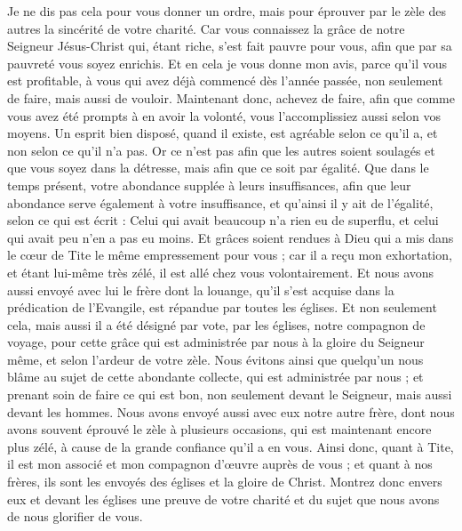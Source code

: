 \begin{multicols}{2}
Je ne dis pas cela pour vous donner un ordre, mais pour éprouver par le zèle des autres la sincérité de votre charité.
Car vous connaissez la grâce de notre Seigneur Jésus-Christ qui, étant riche, s'est fait pauvre pour vous, afin que par sa pauvreté vous soyez enrichis.
Et en cela je vous donne mon avis, parce qu'il vous est profitable, à vous qui avez déjà commencé dès l'année passée, non seulement de faire, mais aussi de vouloir.
Maintenant donc, achevez de faire, afin que comme vous avez été prompts à en avoir la volonté, vous l'accomplissiez aussi selon vos moyens.
Un esprit bien disposé, quand il existe, est agréable selon ce qu'il a, et non selon ce qu'il n'a pas.
Or ce n'est pas afin que les autres soient soulagés et que vous soyez dans la détresse, mais afin que ce soit par égalité. Que dans le temps présent, votre abondance supplée à leurs insuffisances,
afin que leur abondance serve également à votre insuffisance, et qu'ainsi il y ait de l'égalité,
selon ce qui est écrit : Celui qui avait beaucoup n'a rien eu de superflu, et celui qui avait peu n'en a pas eu moins.
Et grâces soient rendues à Dieu qui a mis dans le cœur de Tite le même empressement pour vous ;
car il a reçu mon exhortation, et étant lui-même très zélé, il est allé chez vous volontairement.
Et nous avons aussi envoyé avec lui le frère dont la louange, qu'il s'est acquise dans la prédication de l'Evangile, est répandue par toutes les églises.
Et non seulement cela, mais aussi il a été désigné par vote, par les églises, notre compagnon de voyage, pour cette grâce qui est administrée par nous à la gloire du Seigneur même, et selon l'ardeur de votre zèle.
Nous évitons ainsi que quelqu'un nous blâme au sujet de cette abondante collecte, qui est administrée par nous ;
et prenant soin de faire ce qui est bon, non seulement devant le Seigneur, mais aussi devant les hommes.
Nous avons envoyé aussi avec eux notre autre frère, dont nous avons souvent éprouvé le zèle à plusieurs occasions, qui est maintenant encore plus zélé, à cause de la grande confiance qu'il a en vous.
Ainsi donc, quant à Tite, il est mon associé et mon compagnon d'œuvre auprès de vous ; et quant à nos frères, ils sont les envoyés des églises et la gloire de Christ.
Montrez donc envers eux et devant les églises une preuve de votre charité et du sujet que nous avons de nous glorifier de vous.

\end{multicols}
